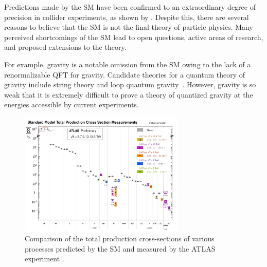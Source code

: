 Predictions made by the SM have been confirmed to an extraordinary degree of precision in collider experiments, as shown by .
Despite this, there are several reasons to believe that the SM is not the final theory of particle physics.
Many perceived shortcomings of the SM lead to open questions, active areas of research, and proposed extensions to the theory.

For example, gravity is a notable omission from the SM owing to the lack of a renormalizable QFT for gravity.
Candidate theories for a quantum theory of gravity include string theory and loop quantum gravity~\cite{GravityQFT}.
However, gravity is so weak that it is extremely difficult to prove a theory of quantized gravity at the energies accessible by current experiments.

\begin{figure}
    \centering
    \includegraphics[width=0.7\textwidth]{Figures/standard_model/sm_summary.pdf}
    \caption{Comparison of the total production cross-sections of various processes predicted by the SM and measured by the ATLAS experiment \cite{ATLAS:2024cgh}.}
    \label{fig:sm_precision}
\end{figure}



